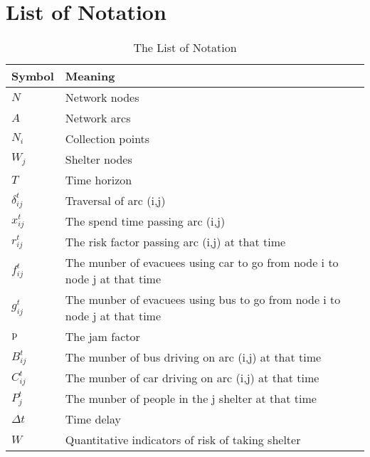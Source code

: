 \documentclass{mcmthesis}
\begin{document}
\section{List of Notation}

\begin{center}
\begin{longtable}{p{}p{}m{}}
\caption{The List of Notation}\\
\hline
Symbol& Meaning \\
\hline

$N$      & Network nodes
                                                         \\
$A$      & Network arcs
                                                          \\
$N_i$     & Collection points
                                                        \\
$W_j$       & Shelter nodes                                                            \\
$T$      & Time horizon                                                            \\
$\delta _{ij}^t$       & Traversal of arc (i,j)                                  \\
$x_{ij}^t$       & The spend time passing arc (i,j)                                         \\
$r_{ij}^t$       & The risk factor passing arc (i,j) at that time                            \\
$f_{ij}^t$       & The munber of evacuees using car to go from node i to node j at that time \\
$g_{ij}^t$       & The munber of evacuees using bus to go from node i to node j at that time \\
$\rm{p}$      & The jam factor                                                            \\
$B_{ij}^t$       & The munber of bus driving on arc (i,j) at that time                      \\
$C_{ij}^t$       & The munber of car driving on arc (i,j) at that time                      \\
$P_j^t$       & The munber of people in the j shelter at that time                       \\
$\Delta t$       & Time delay                                                                \\
$W$       & Quantitative indicators of risk of taking shelter                         \\

\end{longtable}
\end{center}
\end{document}
